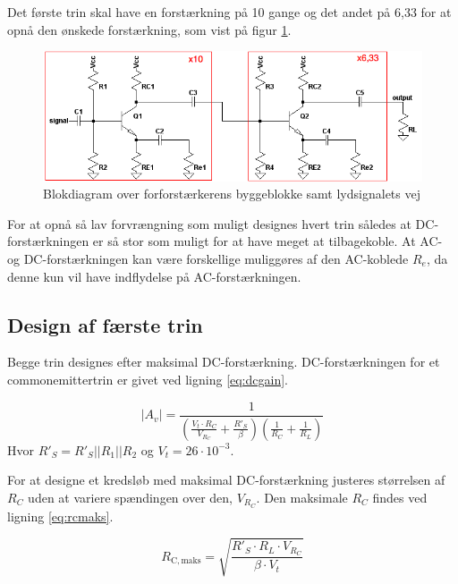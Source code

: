 Det første trin skal have en forstærkning på 10 gange og det andet på 6,33 for at opnå den ønskede forstærkning, som vist på figur \ref{blok_forforstaerker}.

\begin{figure}[h]
\centering
\includegraphics[scale=.6]{teknisk/forforstaerker/blok_forforstaerker.png}
\caption{Blokdiagram over forforstærkerens byggeblokke samt lydsignalets vej}
\label{blok_forforstaerker}
\end{figure}

For at opnå så lav forvrængning som muligt designes hvert trin således at DC-forstærkningen er så stor som muligt for at have meget at tilbagekoble. At AC- og DC-forstærkningen kan være forskellige muliggøres af den AC-koblede $R_e$, da denne kun vil have indflydelse på AC-forstærkningen.

\subsection*{Design af færste trin}
Begge trin designes efter maksimal DC-forstærkning. DC-forstærkningen for et commonemittertrin er givet ved ligning \ref{eq:dcgain}.

\begin{equation}
|A_{v}|=\frac{1}{\left(\frac{V_t \cdot R_C}{V_{R_C}}+\frac{R'_S}{\beta}\right) \left(\frac{1}{R_C}+\frac{1}{R_L}\right)}
\label{eq:dcgain}
\end{equation}
Hvor $R'_S = R'_S||R_1||R_2$ og $V_t = 26 \cdot 10^{-3}$.

For at designe et kredsløb med maksimal DC-forstærkning justeres størrelsen af $R_C$ uden at variere spændingen over den, $V_{R_C}$. Den maksimale $R_C$ findes ved ligning \ref{eq:rcmaks}.

\begin{equation}
R_{\mathrm{C,maks}} = \sqrt{\frac{R'_S \cdot R_L \cdot V_{R_C}}{\beta \cdot V_t}}
\label{eq:rcmaks}
\end{equation}

